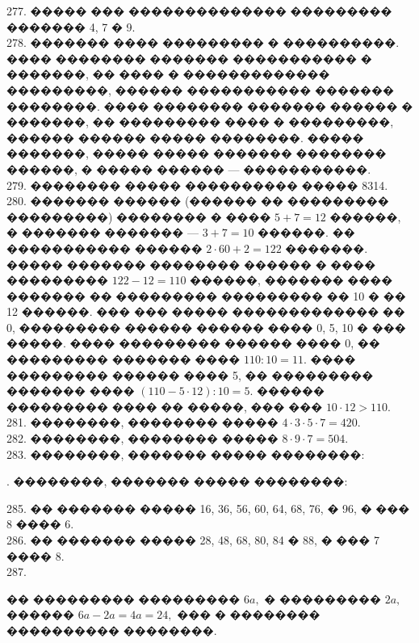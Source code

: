 \documentclass[12pt]{article}
\begin{document}
277. ����� ��� �������������� ��������� ������� 4, 7 � 9.\\
278. ������� ���� ��������� � ����������. ���� �������� ������� ����������� � �������, �� ���� � ������������� ���������, ������ ����������� ������� ��������. ���� �������� ������� ������ � �������, �� ��������� ���� � ���������, ������ ������ ����� ��������. ����� �������, ����� ����� ������� �������� ������, � ����� ������ --- �����������.\\
279. �������� ����� ���������� ����� 8314.\\
280. ������� ������ (������ �� ��������� ���������) �������� � ���� $5+7=12$ ������, � ������� ������� --- $3+7=10$ ������. �� ����������� ������ $2\cdot60+2=122$ �������. ����� ������� �������� ������ � ���� ��������� $122-12=110$ ������, ������� ���� ������� �� ��������� ��������� �� 10 � �� 12 ������. ��� ��� ����� ������������� �� 0, ��������� ������ ������ ���� 0, 5, 10 � ��� �����. ���� ��������� ������ ���� 0, �� ��������� ������� ���� $110:10=11.$ ���� ��������� ������ ���� 5, �� ��������� ������� ���� $(110-5\cdot12):10=5.$ ������ ��������� ���� �� �����, ��� ��� $10\cdot12>110.$\\
281. ��������, �������� ����� $4\cdot3\cdot5\cdot7=420.$\\
282. ��������, �������� ����� $8\cdot9\cdot7=504.$\\
283. ��������, ������� ����� ��������:
\begin{center}
\begin{figure}[ht!]
\end{figure}
\end{center}\newpage
{}. ��������, ������� ����� ��������:
\begin{center}
\begin{figure}[ht!]
\end{figure}
\end{center}
285. �� ������� ����� 16, 36, 56, 60, 64, 68, 76, � 96, � ��� 8 ���� 6.\\
286. �� ������� ����� 28, 48, 68, 80, 84 � 88, � ��� 7 ���� 8.\\
287. \begin{center}
\begin{figure}[ht!]
\end{figure}
\end{center}
�� ��������� ��������� $6a,$ � ��������� $2a,$ ������ $6a-2a=4a=24,$ ��� � �������� ���������� ��������.\\
\end{document}
